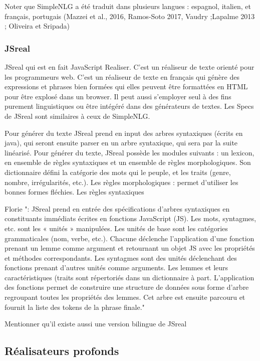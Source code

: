 Noter que SimpleNLG a été traduit dans plusieurs langues : espagnol, italien, et français, portugais (Mazzei et al., 2016, Ramos-Soto 2017, Vaudry ;Lapalme 2013 ; Oliveira et Sripada)

\subsubsection{JSreal} \citep{DaoustJSREALTextRealizer2015}

JSreal qui est en fait JavaScript Realiser. C'est un réaliseur de texte orienté pour les programmeurs web. C'est un réaliseur de texte en français qui génère des expressions et phrases bien formées qui elles peuvent être formattées en HTML pour être explosé dans un browser. Il peut aussi s'employer seul à des fins purement linguistiques ou être intégéré dans des générateurs de textes. Les Specs de JSreal sont similaires à ceux de SimpleNLG.

Pour générer du texte JSreal prend en input des arbres syntaxiques (écrits en java), qui seront ensuite parser en un arbre syntaxique, qui sera par la suite linéarisé. Pour générer du texte, JSreal possède les modules suivants : un lexicon, en ensemble de règles syntaxiques et un ensemble de règles morphologiques. Son dictionnaire défini la catégorie des mots qui le peuple, et les traits (genre, nombre, irrégularités, etc.). Les règles morphologiques : permet d'utiliser les bonnes formes fléchies. Les règles syntaxiques 

Florie ": JSreal prend en entrée des spécifications d'arbres syntaxiques en constituants immédiats écrites en fonctions JavaScript (JS). Les mots, syntagmes, etc. sont les « unités » manipulées. Les unités de base sont les catégories grammaticales (nom, verbe, etc.). Chacune déclenche l'application d'une fonction prenant un lemme comme argument et retournant un objet JS avec les propriétés et méthodes correspondants. Les syntagmes sont des unités déclenchant des fonctions prenant d'autres unités comme arguments. Les lemmes et leurs caractéristiques (traits sont répertoriés dans un dictionnaire à part. L'application des fonctions permet de construire une structure de données sous forme d'arbre regroupant toutes les propriétés des lemmes. Cet arbre est ensuite parcouru et fournit la liste des tokens de la phrase finale."

Mentionner qu'il existe aussi une version bilingue de JSreal \citep{MolinsJSrealBBilingualText2015}

\subsection{Réalisateurs profonds}

